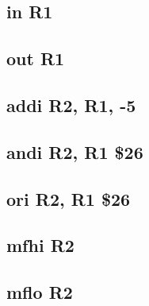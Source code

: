 \documentclass{article}
\begin{document}
    \subsection{in R1} \label{in_sequence}
        
    \subsection{out R1} \label{out_sequence}
        
    \subsection{addi R2, R1, -5} \label{addi_sequence}
        
    \subsection{andi R2, R1 \$26} \label{andi_sequence}
        
    \subsection{ori R2, R1 \$26} \label{ori_sequence}
        
    \subsection{mfhi R2} \label{mfhi_sequence}
        
    \subsection{mflo R2} \label{mflo_sequence}
        

    
\end{document}
